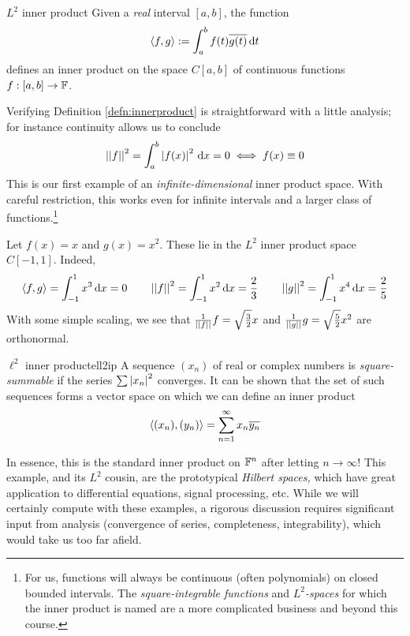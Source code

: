 \begin{defn}{$L^2$ inner product}{}
	Given a \emph{real} interval $[a,b]$, the function
	\[
		\left\langle f,g\right\rangle:=\int_a^b f(t)\overline{g(t)}\,{\mathrm{d} t}
	\]
	defines an inner product on the space $C[a,b]$ of continuous functions $f:[a,b]\to\mathbb{F}$.
\end{defn}


Verifying Definition \ref{defn:innerproduct} is straightforward with a little analysis; for instance continuity allows us to conclude
\[
	\left| \left| f\right|\right|^2=\int_a^b\left| f(x)\right|^2\,{\mathrm{d} x}=0\iff f(x)\equiv 0
\]
This is our first example of an \emph{infinite-dimensional} inner product space. With careful restriction, this works even for infinite intervals and a larger class of functions.\footnote{%
	For us, functions will always be continuous (often polynomials) on closed bounded intervals. The \emph{square-integrable functions} and \emph{$L^2$-spaces} for which the inner product is named are a more complicated business and beyond this course.%
}

\begin{example}{}{}
	Let $f(x)=x$ and $g(x)=x^2$. These lie in the $L^2$ inner product space $C[-1,1]$. Indeed,
	\[
		\left\langle f,g\right\rangle=\int_{-1}^1x^3\,{\mathrm{d} x}=0\qquad 
		\left| \left| f\right|\right|^2=\int_{-1}^1x^2\,{\mathrm{d} x}=\frac 23\qquad 
		\left| \left| g\right|\right|^2=\int_{-1}^1x^4\,{\mathrm{d} x}=\frac 25
	\]
	With some simple scaling, we see that $\frac 1{\left| \left| f\right|\right|}f=\sqrt{\frac 32}x$ and $\frac 1{\left| \left| g\right|\right|}g=\sqrt{\frac 52}x^2$ are orthonormal.
\end{example}


\pagebreak[3]


\begin{defn}{$\ell^2$ inner product}{ell2ip}
	A sequence $(x_n)$ of real or complex numbers is \emph{square-summable} if the series $\sum\left| x_n\right|^2$ converges. It can be shown that the set of such sequences forms a vector space on which we can define an inner product\footnotemark{}
	\[
		\left\langle (x_n),(y_n)\right\rangle=\sum_{n=1}^\infty x_n\overline{y_n}
	\]
\end{defn}


In essence, this is the standard inner product on $\mathbb{F}^n$ after letting $n\to\infty$! This example, and its $L^2$ cousin, are the prototypical \emph{Hilbert spaces,} which have great application to differential equations, signal processing, etc. While we will certainly compute with these examples, a rigorous discussion requires significant input from analysis (convergence of series, completeness, integrability), which would take us too far afield.



